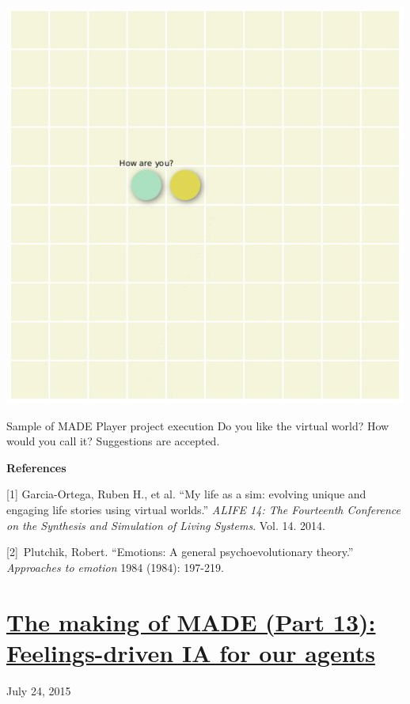 \documentclass[a4paper]{article}
\newcommand\textstyleStrongEmphasis[1]{\textbf{#1}}
\begin{document}
\href{http://www.velonuboso.com/made/blog/wp-content/uploads/2015/07/player1.jpg}{
\includegraphics[width=13.282cm,height=13.282cm]{makingofmade113-img17.jpg}
}

Sample of MADE Player project execution
Do you like the virtual world? How would you call it? Suggestions are
accepted.

\textstyleStrongEmphasis{References}

[1] Garcia-Ortega, Ruben H., et al. {\textquotedblleft}My life as a sim:
evolving unique and engaging life stories using virtual
worlds.{\textquotedblright} \textit{ALIFE 14: The Fourteenth Conference
on the Synthesis and Simulation of Living Systems}. Vol. 14. 2014.

[2]~Plutchik, Robert. {\textquotedblleft}Emotions: A general
psychoevolutionary theory.{\textquotedblright} \textit{Approaches to
emotion} 1984 (1984): 197-219.


\bigskip

\clearpage\section[The making of MADE (Part 13): Feelings{}-driven IA
for our
agents]{\href{http://www.velonuboso.com/made/2015/07/24/making-part-13-feelings-driven-ia-agents/}{The
making of MADE (Part 13): Feelings-driven IA for our agents}}
July 24, 2015
\end{document}
